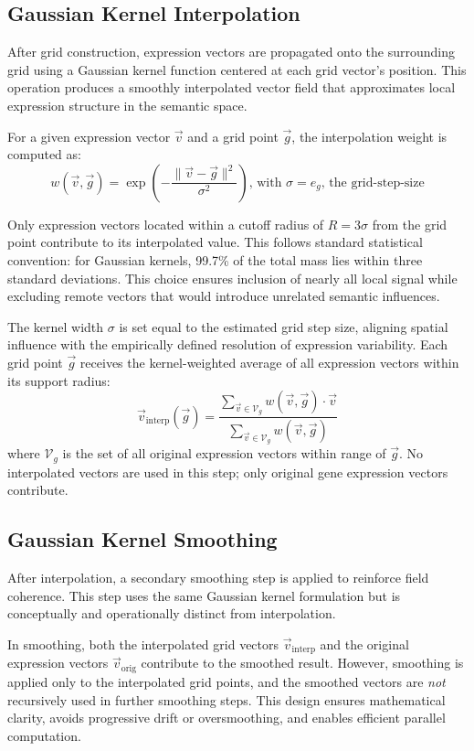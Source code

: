 \documentclass{article}
\begin{document}
\subsection{Gaussian Kernel Interpolation}

After grid construction, expression vectors are propagated onto the surrounding grid using a Gaussian kernel function centered at each grid vector's position. This operation produces a smoothly interpolated vector field that approximates local expression structure in the semantic space.

For a given expression vector \( \vec{v} \) and a grid point \( \vec{g} \), the interpolation weight is computed as:
\[
  w(\vec{v}, \vec{g}) = \exp\left( -\frac{\|\vec{v} - \vec{g}\|^2}{\sigma^2} \right)\text{, with } \sigma = e_g \text{, the grid-step-size}
\]

Only expression vectors located within a cutoff radius of \( R = 3\sigma \) from the grid point contribute to its interpolated value. This follows standard statistical convention: for Gaussian kernels, 99.7\% of the total mass lies within three standard deviations. This choice ensures inclusion of nearly all local signal while excluding remote vectors that would introduce unrelated semantic influences.

The kernel width \( \sigma \) is set equal to the estimated grid step size, aligning spatial influence with the empirically defined resolution of expression variability. Each grid point \( \vec{g} \) receives the kernel-weighted average of all expression vectors within its support radius:
\[
\vec{v}_{\text{interp}}(\vec{g}) = \frac{\sum_{\vec{v} \in \mathcal{V}_g} w(\vec{v}, \vec{g}) \cdot \vec{v}}{\sum_{\vec{v} \in \mathcal{V}_g} w(\vec{v}, \vec{g})}
\]
where \( \mathcal{V}_g \) is the set of all original expression vectors within range of \( \vec{g} \). No interpolated vectors are used in this step; only original gene expression vectors contribute.

\subsection{Gaussian Kernel Smoothing}

After interpolation, a secondary smoothing step is applied to reinforce field coherence. This step uses the same Gaussian kernel formulation but is conceptually and operationally distinct from interpolation.

In smoothing, both the interpolated grid vectors \( \vec{v}_{\text{interp}} \) and the original expression vectors \( \vec{v}_{\text{orig}} \) contribute to the smoothed result. However, smoothing is applied only to the interpolated grid points, and the smoothed vectors are \emph{not} recursively used in further smoothing steps. This design ensures mathematical clarity, avoids progressive drift or oversmoothing, and enables efficient parallel computation.
\end{document}
